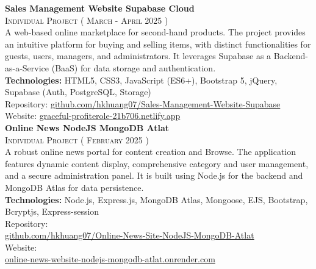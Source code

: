 \documentclass[oneside]{article}
\begin{document}
{\begin{minipage}[t][\dimexpr\textheight-2\fboxrule-2\fboxsep\relax][t]{\dimexpr0.6\textwidth-2\fboxrule-2\fboxsep\relax}
\begin{justify}
        {\large \textbf{Sales Management Website \textendash{} Supabase Cloud }} \\
        {\scshape{}\selectfont\footnotesize Individual Project \qquad ( March - April 2025 )} \\
        A web-based online marketplace for second-hand products. The project provides an intuitive platform for buying and selling items, with distinct functionalities for guests, users, managers, and administrators. It leverages Supabase as a Backend-as-a-Service (BaaS) for data storage and authentication. \\[1ex]
        \textbf{Technologies:} HTML5, CSS3, JavaScript (ES6+), Bootstrap 5, jQuery, Supabase (Auth, PostgreSQL, Storage) \\
        Repository: \href{https://github.com/hkhuang07/Sales-Management-Website-Supabase}{github.com/hkhuang07/Sales-Management-Website-Supabase} \\
        Website: \href{https://graceful-profiterole-21b706.netlify.app/}{graceful-profiterole-21b706.netlify.app} \\

        {\large \textbf{Online News \textendash{} NodeJS \textendash{} MongoDB Atlat}} \\
        {\scshape{}\selectfont\footnotesize Individual Project \qquad ( February 2025 )} \\
        A robust online news portal for content creation and Browse. The application features dynamic content display, comprehensive category and user management, and a secure administration panel. It is built using Node.js for the backend and MongoDB Atlas for data persistence. \\[1ex]
        \textbf{Technologies:} Node.js, Express.js, MongoDB Atlas, Mongoose, EJS, Bootstrap, Bcryptjs, Express-session \\
        Repository:\\ \href{https://github.com/hkhuang07/Online-News-Site-NodeJS-MongoDB-Atlat}{github.com/hkhuang07/Online-News-Site-NodeJS-MongoDB-Atlat} \\
        Website:\\ \href{https://online-news-website-nodejs-mongodb-atlat.onrender.com/}{online-news-website-nodejs-mongodb-atlat.onrender.com}\\
        

\end{justify}
\end{minipage}}
\end{document}
